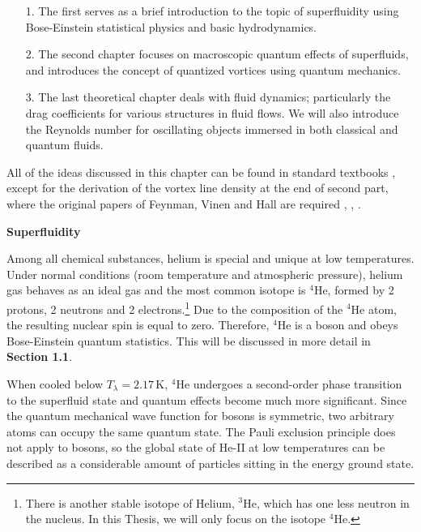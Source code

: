\documentclass[a4paper, 12pt]{report}
\newcommand{\unit}[1]{\,\mathrm{#1}}
\newcommand{\He}{{}^4\mathrm{He}}
\newcommand{\<}{\langle}
\renewcommand{\>}{\rangle}
\begin{document}
\begin{itemize}
	\item[1.] The first serves as a brief introduction to the topic of superfluidity using  Bose-Einstein statistical physics and basic hydrodynamics.
	
	\item[2.] The second chapter focuses on macroscopic quantum effects of superfluids, and introduces the concept of quantized vortices using quantum mechanics.
	
	\item[3.] The last theoretical chapter deals with fluid dynamics; particularly the drag coefficients for various structures in fluid flows. We will also introduce the Reynolds number for oscillating objects immersed in both classical and quantum fluids.
\end{itemize}
All of the ideas discussed in this chapter can be found in standard textbooks \cite{skrbek}, \cite{landau} except for the derivation of the vortex line density at the end of second part, where the original papers of Feynman, Vinen and Hall are required \cite{feynman}, \cite{vinen1}, \cite{vinen2}.

\vspace{1cm}
{\Huge \bfseries Superfluidity}
\vspace{0.3cm}


Among all chemical substances, helium is special and unique at low temperatures. Under normal conditions (room temperature and atmospheric pressure), helium gas behaves as an ideal gas and the most common isotope is $\He$, formed by 2 protons, 2 neutrons and 2 electrons.\footnote{There is another stable isotope of Helium, ${}^3\mathrm{He}$, which has one less neutron in the nucleus. In this Thesis, we will only focus on the isotope $\He$.} Due to the composition of the $\He$ atom, the resulting nuclear spin is equal to zero. Therefore, $\He$  is a boson and obeys Bose-Einstein quantum statistics. This will be discussed in more detail in {\sffamily\textbf{Section 1.1}}.

When cooled below $ T_{\lambda}=2.17\unit{K} $, $\He$ undergoes a second-order phase transition to the superfluid state and quantum effects become much more significant. Since the quantum mechanical wave function for bosons is symmetric, two arbitrary atoms can occupy the same quantum state. The Pauli exclusion principle does not apply to bosons, so the global state of He-II at low temperatures can be described as a considerable amount of particles sitting in the energy ground state.
\end{document}
